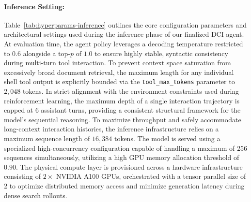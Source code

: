 \documentclass{article} %
\begin{document}
\paragraph{Inference Setting:} 

Table~\ref{tab:hyperparams-inference} outlines the core configuration parameters and architectural settings used during the inference phase of our finalized DCI agent. At evaluation time, the agent policy leverages a decoding temperature restricted to $0.6$ alongside a top-$p$ of $1.0$ to ensure highly stable, syntactic consistency during multi-turn tool interaction. To prevent context space saturation from excessively broad document retrieval, the maximum length for any individual shell tool output is explicitly bounded via the \texttt{tool\_max\_tokens} parameter to $2,048$ tokens. In strict alignment with the environment constraints used during reinforcement learning, the maximum depth of a single interaction trajectory is capped at $6$ assistant turns, providing a consistent structural framework for the model's sequential reasoning. To maximize throughput and safely accommodate long-context interaction histories, the inference infrastructure relies on a maximum sequence length of $16,384$ tokens. The model is served using a specialized high-concurrency configuration capable of handling a maximum of $256$ sequences simultaneously, utilizing a high GPU memory allocation threshold of $0.90$. The physical compute layer is provisioned across a hardware infrastructure consisting of $2\times$ NVIDIA A100 GPUs, orchestrated with a tensor parallel size of $2$ to optimize distributed memory access and minimize generation latency during dense search rollouts.
\end{document}
